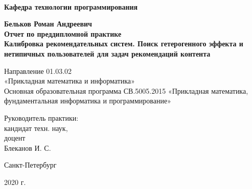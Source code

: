 
\begin{titlepage}
\begin{center}
\\
\textbf{Кафедра технологии программирования}

\vspace{32mm}

\textbf{\Large Бельков Роман Андреевич} \\[8mm]
\textbf{\large Отчет по преддипломной практике}\\[18mm]
\textbf{\Large Калибровка рекомендательных систем. Поиск гетерогенного эффекта и нетипичных пользователей для задач рекомендаций контента}

\vspace{16mm}
Направление 01.03.02 \\«Прикладная математика и информатика»\\
Основная образовательная программа СВ.5005.2015
«Прикладная математика, фундаментальная информатика и программирование»\\

\vspace{26mm}

\begin{flushleft}
{\setlength{\leftskip}{22em}
 {Руководитель практики:} \\
 кандидат техн. наук, \\
 доцент \\ Блеканов И. С. \\
}
\end{flushleft}

\vfill

{Санкт-Петербург}
\par{2020 г.}
\end{center}
\end{titlepage}
\restoregeometry
\addtocounter{page}{1}